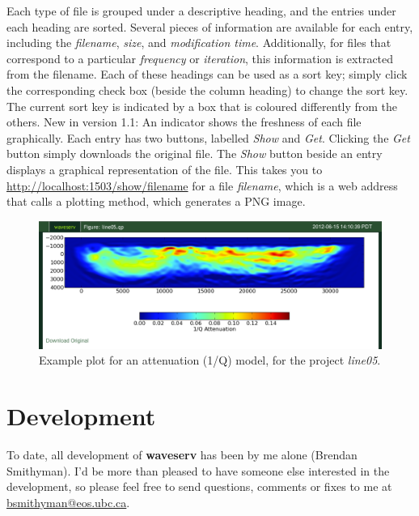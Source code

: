 \documentclass[letterpaper,10pt,english]{sphinxmanual}
\begin{document}
Each type of file is grouped under a descriptive heading, and the entries under each heading are sorted.  Several pieces of information are available for each entry, including the \emph{filename}, \emph{size}, and \emph{modification time}.  Additionally, for files that correspond to a particular \emph{frequency} or \emph{iteration}, this information is extracted from the filename.  Each of these headings can be used as a sort key; simply click the corresponding check box (beside the column heading) to change the sort key.  The current sort key is indicated by a box that is coloured differently from the others.
New in version 1.1: An indicator shows the freshness of each file graphically.
Each entry has two buttons, labelled \emph{Show} and \emph{Get}.  Clicking the \emph{Get} button simply downloads the original file.  The \emph{Show} button beside an entry displays a graphical representation of the file.  This takes you to \href{http://localhost:1503/show/filename}{http://localhost:1503/show/filename} for a file \emph{filename}, which is a web address that calls a plotting method, which generates a PNG image.
\begin{figure}[htbp]
\centering
\capstart

\includegraphics{qpmodel.png}
\caption{Example plot for an attenuation (1/Q) model, for the project \emph{line05}.}\end{figure}


\chapter{Development}
\label{development:development}\label{development::doc}\label{development:devel}
To date, all development of \textbf{waveserv} has been by me alone (Brendan Smithyman).  I'd be more than pleased to have someone else interested in the development, so please feel free to send questions, comments or fixes to me at \href{mailto:bsmithyman@eos.ubc.ca}{bsmithyman@eos.ubc.ca}.
\end{document}

